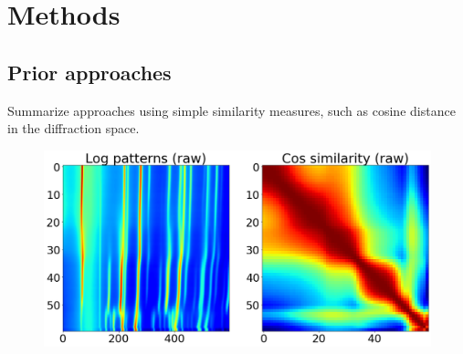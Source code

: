 \documentclass[12pt]{iopart}
\begin{document}

\section{Methods}

\subsection{Prior approaches}
Summarize approaches using simple similarity measures, such as cosine distance in the diffraction space.

\begin{figure}
  \includegraphics[width=\linewidth]{paper_figures/1/raw_with_similarity.png}
  \caption{}
  \label{fig:noise}
\end{figure}
\end{document}
